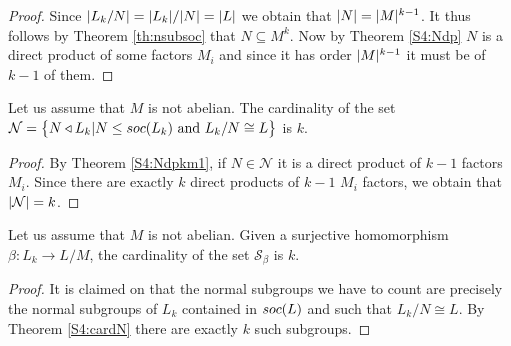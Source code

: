 \begin{proof}
    Since $| L_k/N | = | L_k | / | N | = | L |$ we obtain that $| N | = | M |^{k-1}$. It thus follows by Theorem \ref{th:nsubsoc} that $N \subseteq M^k$. Now by Theorem \ref{S4:Ndp} $N$ is a direct product of some factors $M_i$ and since it has order $| M |^{k-1}$ it must be of $k-1$ of them. 
\end{proof}

\begin{theorem}
    \label{S4:cardN}
    Let us assume that $M$ is not abelian. The cardinality of the set $\mathcal{N} = \left\{N \triangleleft L_k | N \le soc {(L_k)} \text{ and } L_k /N \cong L \right\}$ is $k$.
\end{theorem}

\begin{proof}
    By Theorem \ref{S4:Ndpkm1}, if $N \in \mathcal{N}$ it is a direct product of $k-1$ factors $M_i$. Since there are exactly $k$ direct products of $k-1$ $M_i$ factors, we obtain that $| \mathcal{N} | = k$.
\end{proof}

\begin{theorem}
    \label{cardS}
    Let us assume that $M$ is not abelian. Given a surjective homomorphism $\beta \colon L_k \rightarrow L/M$, the cardinality of the set $\mathscr{S}_\beta$ is $k$.
\end{theorem}

\begin{proof}
    It is claimed on \cite[Lemma 2.5]{DallaVoltaFGNMGAPQ} that the normal subgroups we have to count are precisely the normal subgroups of $L_k$ contained in $soc {(L)}$ and such that $L_k/N \cong L$. By Theorem \ref{S4:cardN} there are exactly $k$ such subgroups.
    
    
\end{proof}